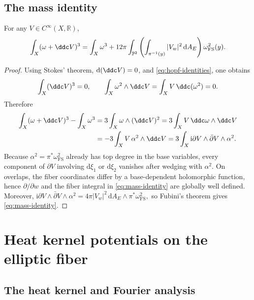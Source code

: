 \documentclass[11pt,a4paper]{article}
\begin{document}
	\subsection{The mass identity}

	\begin{lemma}\label{lem:mass}
		For any $V\in C^\infty(X,\mathbb R)$,
		\begin{equation}\label{eq:mass-identity}
			\int_X(\omega+\ddc V)^3
			=\int_X\omega^3+12\pi\int_{\mathbb P^2}
			\left(\int_{\pi^{-1}(y)}|V_w|^2\,\mathrm{d}A_E\right)
			\omega_{\mathrm{FS}}^2(y).
		\end{equation}
	\end{lemma}

	\begin{proof}
		Using Stokes' theorem,
		$\mathrm{d}(\ddc V)=0$, and \eqref{eq:hopf-identities}, one obtains
		\[
		\int_X(\ddc V)^3=0,
		\qquad
		\int_X\omega^2\wedge\ddc V
		=\int_X V\,\ddc(\omega^2)=0.
		\]
		Therefore
		\begin{align*}
			\int_X(\omega+\ddc V)^3-\int_X\omega^3
			&=3\int_X\omega\wedge(\ddc V)^2=3\int_X V\,\ddc\omega\wedge\ddc V\\
			&=-3\int_X V\,\alpha^2\wedge\ddc V=3\int_X\mathrm{i}\partial V\wedge\bar\partial V\wedge\alpha^2.
		\end{align*}
		Because $\alpha^2=\pi^*\omega_{\mathrm{FS}}^2$ already has top degree in the
		base variables, every component of $\partial V$ involving
		$\mathrm{d}\xi_1$ or $\mathrm{d}\xi_2$ vanishes after wedging with
		$\alpha^2$.  On overlaps, the fiber coordinates differ by a
		base-dependent holomorphic function, hence $\partial/\partial w$ and the
		fiber integral in \eqref{eq:mass-identity} are globally well defined.
		Moreover,
		\(
			\mathrm{i}\partial V\wedge\bar\partial V\wedge\alpha^2
			=4\pi |V_w|^2\,\mathrm{d}A_E\wedge\pi^*\omega_{\mathrm{FS}}^2,
		\)
		so Fubini's theorem gives \eqref{eq:mass-identity}.
	\end{proof}
	
	\section{Heat kernel potentials on the elliptic fiber}

	\subsection{The heat kernel and Fourier analysis}
	
\end{document}

